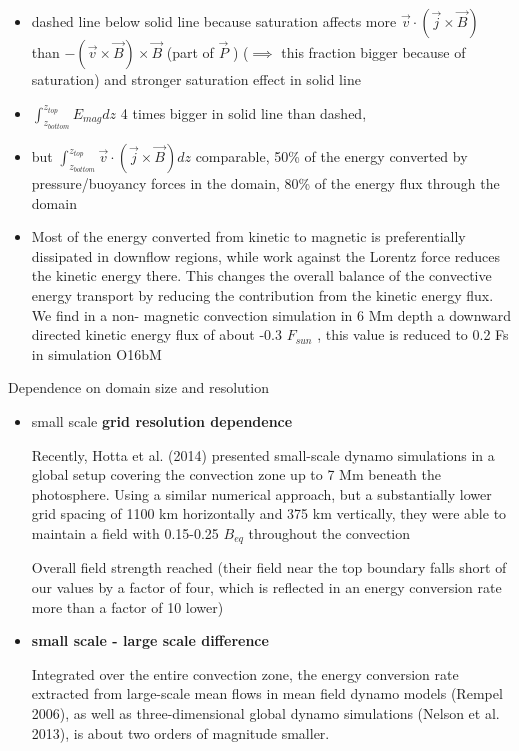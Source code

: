 \documentclass{beamer}
\begin{document}
\begin{frame}
\begin{itemize}
\item dashed line below solid line because saturation affects more $\vec{v} \cdot \left( \vec{j} \times \vec{B} \right)$ than $-(\vec{v} \times \vec{B}) \times \vec{B}$ (part of $\vec{P}$ ) ($\implies$ this fraction bigger because of saturation)
and stronger saturation effect in solid line
\item  $\int_{z_{bottom}}^{z_{top}}{E_{mag} dz}$ 4 times bigger in solid line than dashed, 
\item but $\int_{z_{bottom}}^{z_{top}}{ \vec{v} \cdot \left( \vec{j} \times \vec{B} \right)dz }$ comparable, 50\% of the energy
converted by pressure/buoyancy forces in the domain, 80\% of the
energy flux through the domain
\item Most of
the energy converted from kinetic to magnetic is preferentially
dissipated in downflow regions, while work against the Lorentz
force reduces the kinetic energy there. This changes the overall
balance of the convective energy transport by reducing the
contribution from the kinetic energy flux. We find in a non-
magnetic convection simulation in 6 Mm depth a downward
directed kinetic energy flux of about -0.3 $F_{sun}$ , this value is
reduced to 0.2 Fs in simulation O16bM
\end{itemize}
\end{frame}


\begin{frame}{Dependence on domain size and resolution}
\begin{itemize}
\item small scale {\bf grid resolution dependence}

Recently, Hotta et al. (2014) presented small-scale dynamo
simulations in a global setup covering the convection zone
up to 7 Mm beneath the photosphere. Using a similar numerical
 approach, but a substantially lower grid spacing of
1100 km horizontally and 375 km vertically, they were able to
maintain a field with 0.15-0.25 $B_{eq}$ throughout the convection

Overall field strength reached (their
field near the top boundary falls short of our values by a factor
of four, which is reflected in an energy conversion rate more
than a factor of 10 lower)

\item {\bf small scale - large scale difference}

Integrated over the entire convection
zone, the energy conversion rate
extracted from large-scale mean
flows in mean field dynamo models (Rempel 2006), as well
as three-dimensional global dynamo simulations (Nelson et al.
2013), is about two orders of magnitude smaller.

\end{itemize}

\end{frame}
\end{document}
